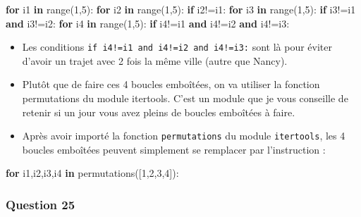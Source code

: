 \documentclass[
  paper=a4,
  ,captions=tableheading
]{scrartcl}
\newenvironment{Shaded}{}{}
\newcommand{\BuiltInTok}[1]{\textcolor[rgb]{0.00,0.50,0.00}{#1}}
\newcommand{\ControlFlowTok}[1]{\textcolor[rgb]{0.00,0.44,0.13}{\textbf{#1}}}
\newcommand{\DecValTok}[1]{\textcolor[rgb]{0.25,0.63,0.44}{#1}}
\newcommand{\KeywordTok}[1]{\textcolor[rgb]{0.00,0.44,0.13}{\textbf{#1}}}
\newcommand{\NormalTok}[1]{#1}
\newcommand{\OperatorTok}[1]{\textcolor[rgb]{0.40,0.40,0.40}{#1}}
\providecommand{\tightlist}{%
  \setlength{\itemsep}{0pt}\setlength{\parskip}{0pt}}
\begin{document}
\begin{Shaded}
\begin{Highlighting}[]
\ControlFlowTok{for}\NormalTok{ i1 }\KeywordTok{in} \BuiltInTok{range}\NormalTok{(}\DecValTok{1}\NormalTok{,}\DecValTok{5}\NormalTok{):}
    \ControlFlowTok{for}\NormalTok{ i2 }\KeywordTok{in} \BuiltInTok{range}\NormalTok{(}\DecValTok{1}\NormalTok{,}\DecValTok{5}\NormalTok{):}
        \ControlFlowTok{if}\NormalTok{ i2}\OperatorTok{!=}\NormalTok{i1:}
            \ControlFlowTok{for}\NormalTok{ i3 }\KeywordTok{in} \BuiltInTok{range}\NormalTok{(}\DecValTok{1}\NormalTok{,}\DecValTok{5}\NormalTok{):}
                \ControlFlowTok{if}\NormalTok{ i3}\OperatorTok{!=}\NormalTok{i1 }\KeywordTok{and}\NormalTok{ i3}\OperatorTok{!=}\NormalTok{i2:}
                    \ControlFlowTok{for}\NormalTok{ i4 }\KeywordTok{in} \BuiltInTok{range}\NormalTok{(}\DecValTok{1}\NormalTok{,}\DecValTok{5}\NormalTok{):}
                        \ControlFlowTok{if}\NormalTok{ i4}\OperatorTok{!=}\NormalTok{i1 }\KeywordTok{and}\NormalTok{ i4}\OperatorTok{!=}\NormalTok{i2 }\KeywordTok{and}\NormalTok{ i4}\OperatorTok{!=}\NormalTok{i3:}
\end{Highlighting}
\end{Shaded}

\begin{itemize}
\tightlist
\item
  Les conditions \texttt{if\ i4!=i1\ and\ i4!=i2\ and\ i4!=i3:} sont là
  pour éviter d'avoir un trajet avec 2 fois la même ville (autre que
  Nancy).
\item
  Plutôt que de faire ces 4 boucles emboîtées, on va utiliser la
  fonction permutations du module itertools. C'est un module que je vous
  conseille de retenir si un jour vous avez pleins de boucles emboîtées
  à faire.
\item
  Après avoir importé la fonction \texttt{permutations} du module
  \texttt{itertools}, les 4 boucles emboîtées peuvent simplement se
  remplacer par l'instruction :
\end{itemize}

\begin{Shaded}
\begin{Highlighting}[]
\ControlFlowTok{for}\NormalTok{ i1,i2,i3,i4 }\KeywordTok{in}\NormalTok{ permutations([}\DecValTok{1}\NormalTok{,}\DecValTok{2}\NormalTok{,}\DecValTok{3}\NormalTok{,}\DecValTok{4}\NormalTok{]):}
\end{Highlighting}
\end{Shaded}

\hypertarget{question-25}{%
\subsubsection{Question 25}\label{question-25}}
\end{document}

